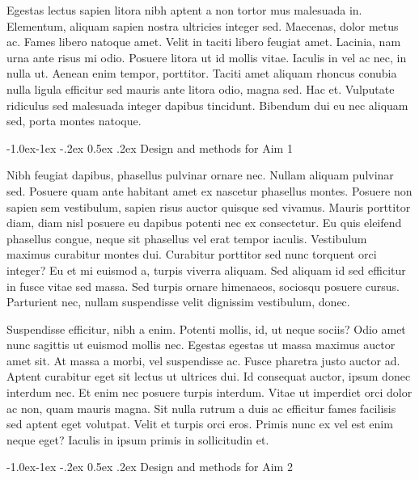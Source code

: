 \documentclass[11pt,]{article}
\makeatletter
\renewcommand\subsubsection{
  \@startsection{subsubsection}{3}{\z@}
    {-1.0ex\@plus -1ex \@minus -.2ex}%
    {0.5ex \@plus .2ex}%
    {\normalfont\normalsize\bf}} %
\makeatother
\begin{document}
Egestas lectus sapien litora nibh aptent a non tortor mus malesuada in.
Elementum, aliquam sapien nostra ultricies integer sed. Maecenas, dolor
metus ac. Fames libero natoque amet. Velit in taciti libero feugiat
amet. Lacinia, nam urna ante risus mi odio. Posuere litora ut id mollis
vitae. Iaculis in vel ac nec, in nulla ut. Aenean enim tempor,
porttitor. Taciti amet aliquam rhoncus conubia nulla ligula efficitur
sed mauris ante litora odio, magna sed. Hac et. Vulputate ridiculus sed
malesuada integer dapibus tincidunt. Bibendum dui eu nec aliquam sed,
porta montes natoque.

\hypertarget{design-and-methods-for-aim-1}{%
\subsubsection{Design and methods for Aim
1}\label{design-and-methods-for-aim-1}}

Nibh feugiat dapibus, phasellus pulvinar ornare nec. Nullam aliquam
pulvinar sed. Posuere quam ante habitant amet ex nascetur phasellus
montes. Posuere non sapien sem vestibulum, sapien risus auctor quisque
sed vivamus. Mauris porttitor diam, diam nisl posuere eu dapibus potenti
nec ex consectetur. Eu quis eleifend phasellus congue, neque sit
phasellus vel erat tempor iaculis. Vestibulum maximus curabitur montes
dui. Curabitur porttitor sed nunc torquent orci integer? Eu et mi
euismod a, turpis viverra aliquam. Sed aliquam id sed efficitur in fusce
vitae sed massa. Sed turpis ornare himenaeos, sociosqu posuere cursus.
Parturient nec, nullam suspendisse velit dignissim vestibulum, donec.

Suspendisse efficitur, nibh a enim. Potenti mollis, id, ut neque sociis?
Odio amet nunc sagittis ut euismod mollis nec. Egestas egestas ut massa
maximus auctor amet sit. At massa a morbi, vel suspendisse ac. Fusce
pharetra justo auctor ad. Aptent curabitur eget sit lectus ut ultrices
dui. Id consequat auctor, ipsum donec interdum nec. Et enim nec posuere
turpis interdum. Vitae ut imperdiet orci dolor ac non, quam mauris
magna. Sit nulla rutrum a duis ac efficitur fames facilisis sed aptent
eget volutpat. Velit et turpis orci eros. Primis nunc ex vel est enim
neque eget? Iaculis in ipsum primis in sollicitudin et.

\hypertarget{design-and-methods-for-aim-2}{%
\subsubsection{Design and methods for Aim
2}\label{design-and-methods-for-aim-2}}
\end{document}
